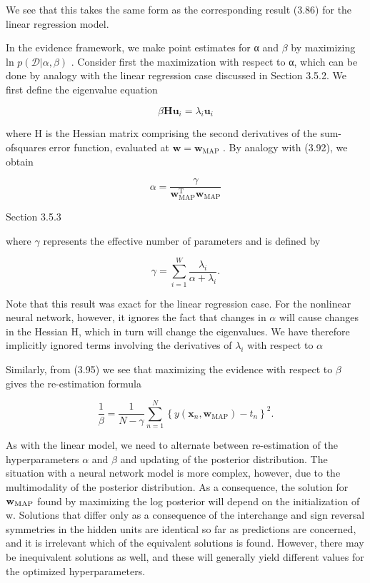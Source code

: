 \documentclass[
  10
]{article}
\begin{document}
We see that this takes the same form as the corresponding result (3.86)
for the linear regression model.

In the evidence framework, we make point estimates for α and \(\beta\)
by maximizing ln \(p ( \mathcal { D } | \alpha , \beta )\) . Consider
first the maximization with respect to α, which can be done by analogy
with the linear regression case discussed in Section 3.5.2. We first
define the eigenvalue equation

\[
\beta \mathbf {H} \mathbf {u} _ {i} = \lambda_ {i} \mathbf {u} _ {i}\tag{5.177}
\]

where H is the Hessian matrix comprising the second derivatives of the
sum-ofsquares error function, evaluated at
\(\mathbf { w } = \mathbf { w } _ { \mathrm { M A P } }\) . By analogy
with (3.92), we obtain

\[
\alpha = \frac {\gamma}{\mathbf {w} _ {\mathrm{MAP}} ^ {\mathrm{T}} \mathbf {w} _ {\mathrm{MAP}}}\tag{5.178}
\]

Section 3.5.3

where \(\gamma\) represents the effective number of parameters and is
defined by

\[
\gamma = \sum_ {i = 1} ^ {W} \frac {\lambda_ {i}}{\alpha + \lambda_ {i}}.\tag{5.179}
\]

Note that this result was exact for the linear regression case. For the
nonlinear neural network, however, it ignores the fact that changes in
\(\alpha\) will cause changes in the Hessian H, which in turn will
change the eigenvalues. We have therefore implicitly ignored terms
involving the derivatives of \(\lambda _ { i }\) with respect to
\(\alpha\)

Similarly, from (3.95) we see that maximizing the evidence with respect
to \(\beta\) gives the re-estimation formula

\[
\frac {1}{\beta} = \frac {1}{N - \gamma} \sum_ {n = 1} ^ {N} \left\{y (\mathbf {x} _ {n}, \mathbf {w} _ {\mathrm{MAP}}) - t _ {n} \right\} ^ {2}.\tag{5.180}
\]

As with the linear model, we need to alternate between re-estimation of
the hyperparameters \(\alpha\) and \(\beta\) and updating of the
posterior distribution. The situation with a neural network model is
more complex, however, due to the multimodality of the posterior
distribution. As a consequence, the solution for
\({ \bf w } _ { \mathrm { M A P } }\) found by maximizing the log
posterior will depend on the initialization of w. Solutions that differ
only as a consequence of the interchange and sign reversal symmetries in
the hidden units are identical so far as predictions are concerned, and
it is irrelevant which of the equivalent solutions is found. However,
there may be inequivalent solutions as well, and these will generally
yield different values for the optimized hyperparameters.
\end{document}
